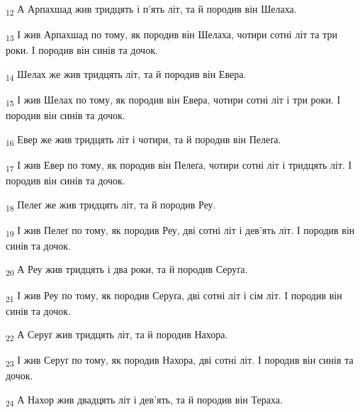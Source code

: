 \begin{tcolorbox}
\textsubscript{12} А Арпахшад жив тридцять і п'ять літ, та й породив він Шелаха.
\end{tcolorbox}
\begin{tcolorbox}
\textsubscript{13} І жив Арпахшад по тому, як породив він Шелаха, чотири сотні літ та три роки. І породив він синів та дочок.
\end{tcolorbox}
\begin{tcolorbox}
\textsubscript{14} Шелах же жив тридцять літ, та й породив він Евера.
\end{tcolorbox}
\begin{tcolorbox}
\textsubscript{15} І жив Шелах по тому, як породив він Евера, чотири сотні літ і три роки. І породив він синів та дочок.
\end{tcolorbox}
\begin{tcolorbox}
\textsubscript{16} Евер же жив тридцять літ і чотири, та й породив він Пелеґа.
\end{tcolorbox}
\begin{tcolorbox}
\textsubscript{17} І жив Евер по тому, як породив він Пелеґа, чотири сотні літ і тридцять літ. І породив він синів та дочок.
\end{tcolorbox}
\begin{tcolorbox}
\textsubscript{18} Пелеґ же жив тридцять літ, та й породив Реу.
\end{tcolorbox}
\begin{tcolorbox}
\textsubscript{19} І жив Пелеґ по тому, як породив Реу, дві сотні літ і дев'ять літ. І породив він синів та дочок.
\end{tcolorbox}
\begin{tcolorbox}
\textsubscript{20} А Реу жив тридцять і два роки, та й породив Серуґа.
\end{tcolorbox}
\begin{tcolorbox}
\textsubscript{21} І жив Реу по тому, як породив Серуґа, дві сотні літ і сім літ. І породив він синів та дочок.
\end{tcolorbox}
\begin{tcolorbox}
\textsubscript{22} А Серуґ жив тридцять літ, та й породив Нахора.
\end{tcolorbox}
\begin{tcolorbox}
\textsubscript{23} І жив Серуґ по тому, як породив Нахора, дві сотні літ. І породив він синів та дочок.
\end{tcolorbox}
\begin{tcolorbox}
\textsubscript{24} А Нахор жив двадцять літ і дев'ять, та й породив він Тераха.
\end{tcolorbox}
